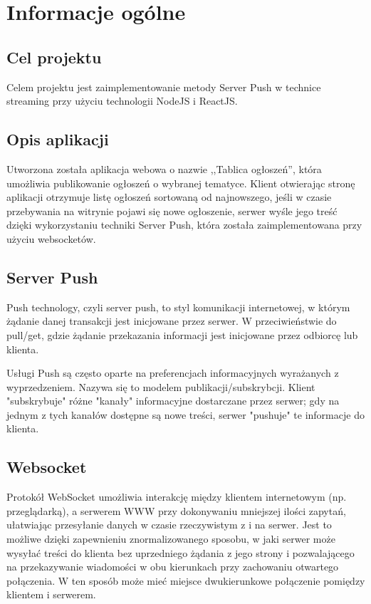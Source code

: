 \documentclass{sprawozdanie-agh}
\begin{document}
   
	
	
	\stronatytulowa{}
	
	\section{Informacje ogólne}

		\subsection{Cel projektu}
		Celem projektu jest zaimplementowanie metody Server Push w technice streaming przy użyciu technologii NodeJS i ReactJS.

		\subsection{Opis aplikacji}
		Utworzona została aplikacja webowa o nazwie ,,Tablica ogłoszeń'', która umożliwia publikowanie ogłoszeń o wybranej tematyce. Klient otwierając stronę aplikacji otrzymuje listę ogłoszeń sortowaną od najnowszego, jeśli w czasie przebywania na witrynie pojawi się nowe ogłoszenie, serwer wyśle jego treść dzięki wykorzystaniu techniki Server Push, która została zaimplementowana przy użyciu websocketów. 

		\subsection{Server Push}
		Push technology, czyli server push, to styl komunikacji internetowej, w którym żądanie danej transakcji jest inicjowane przez serwer. W przeciwieństwie do pull/get, gdzie żądanie przekazania informacji jest inicjowane przez odbiorcę lub klienta.

		Usługi Push są często oparte na preferencjach informacyjnych wyrażanych z wyprzedzeniem. Nazywa się to modelem publikacji/subskrybcji. Klient "subskrybuje" różne "kanały" informacyjne dostarczane przez serwer; gdy na jednym z tych kanałów dostępne są nowe treści, serwer "pushuje" te informacje do klienta.

		\subsection{Websocket}
		Protokół WebSocket umożliwia interakcję między klientem internetowym (np. przeglądarką), a serwerem WWW przy dokonywaniu mniejszej ilości zapytań, ułatwiając przesyłanie danych w czasie rzeczywistym z i na serwer. Jest to możliwe dzięki zapewnieniu znormalizowanego sposobu, w jaki serwer może wysyłać treści do klienta bez uprzedniego żądania z jego strony i pozwalającego na przekazywanie wiadomości w obu kierunkach przy zachowaniu otwartego połączenia. W ten sposób może mieć miejsce dwukierunkowe połączenie pomiędzy klientem i serwerem. 
\end{document}
